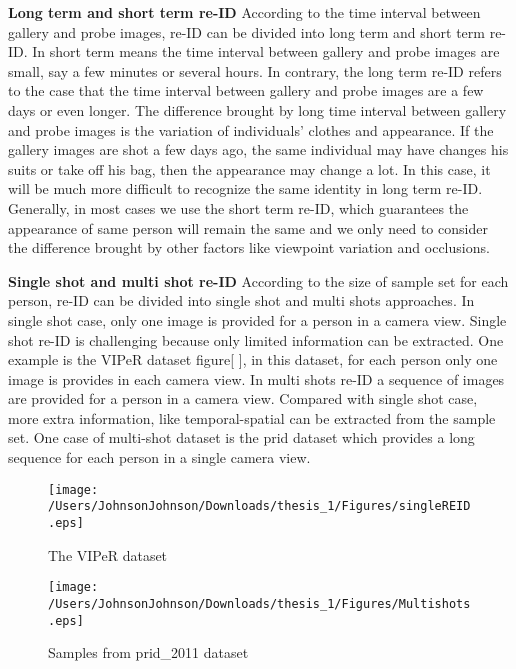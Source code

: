 \textbf{Long term and short term re-ID} According to the time interval between gallery and probe images, re-ID can be divided into long term and short term re-ID.  In short term means the time interval between gallery and probe images are small, say a few minutes or several hours. In contrary, the long term re-ID refers to the case that the time interval between gallery and probe images are a few days or even longer. The difference brought by long time interval between gallery and probe images is the variation of individuals' clothes and appearance. If the gallery images are shot a few days ago, the same individual may have changes his suits or take off his bag, then the appearance may change a lot. In this case, it will be much more difficult to recognize the same identity in long term re-ID. Generally, in most cases we use the short term re-ID, which guarantees the appearance of same person will remain the same and we only need to consider the difference brought by other factors like viewpoint variation and occlusions.


\textbf{Single shot and multi shot re-ID} According to the size of sample set for each person, re-ID can be divided into single shot and multi shots approaches. In single shot case, only one image is provided for a person in a camera view. Single shot re-ID is challenging because only limited information can be extracted. One example is the VIPeR dataset figure[ ], in this dataset, for each person only one image is provides in each camera view. In multi shots re-ID a sequence of images are provided for a person in a camera view. Compared with single shot case, more extra information, like temporal-spatial can be extracted from the sample set. One case of multi-shot dataset is the prid dataset which provides a long sequence for each person in a single camera view.

\begin{figure}[H]

\texttt{[image: /Users/JohnsonJohnson/Downloads/thesis\_1/Figures/singleREID.eps]}
\vspace{-2em}
\caption{The VIPeR dataset}

\end{figure}

\begin{figure}[H]

\texttt{[image: /Users/JohnsonJohnson/Downloads/thesis\_1/Figures/Multishots.eps]}
\vspace{-2em}
\caption{Samples from prid\_2011 dataset}

\end{figure}


